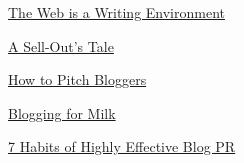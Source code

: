             
            
              
                
              
              
              
                \href{http://davenet.scripting.com/2001/04/17/theWebIsAWritingEnvironment}{The Web is a Writing Environment}


              
            
            
              
            
            
              
                
              
              
              
                \href{http://zpedia.org/A\_Sell-Out\%27s\_Tale}{A Sell-Out's Tale}


              
            
            
              
            
            
              
                
              
              
              
                \href{http://technoflak.blogspot.com/2005/01/how-to-pitch-bloggers\_30.html}{How to Pitch Bloggers}


              
            
            
              
            
            
              
                
              
              
              
                \href{http://slate.msn.com/id/2081419/}{Blogging for Milk}


              
            
            
              
            
            
              
                
              
              
              
                \href{http://fusionbrand.blogs.com/fusionbrand/2005/02/nbsp\_nbspnbsp\_n.html}{7 Habits of Highly Effective Blog PR}


